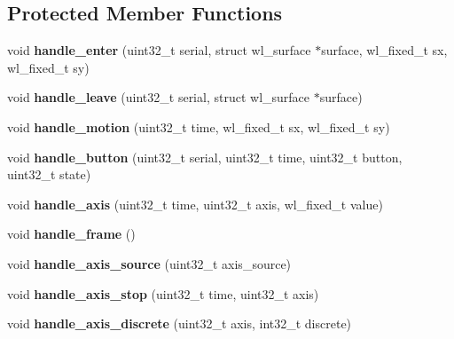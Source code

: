 \subsection*{Protected Member Functions}
\begin{DoxyCompactItemize}
\item 
\mbox{\label{classwayland_1_1Pointer_a6ea610d1c0aa682a272f5fded028b1ac}} 
void {\bfseries handle\+\_\+enter} (uint32\+\_\+t serial, struct wl\+\_\+surface $\ast$surface, wl\+\_\+fixed\+\_\+t sx, wl\+\_\+fixed\+\_\+t sy)
\item 
\mbox{\label{classwayland_1_1Pointer_a3b568853223df41028eef7b0ad0955f5}} 
void {\bfseries handle\+\_\+leave} (uint32\+\_\+t serial, struct wl\+\_\+surface $\ast$surface)
\item 
\mbox{\label{classwayland_1_1Pointer_a875bf5c1e192abc192e1f0f4b1d65129}} 
void {\bfseries handle\+\_\+motion} (uint32\+\_\+t time, wl\+\_\+fixed\+\_\+t sx, wl\+\_\+fixed\+\_\+t sy)
\item 
\mbox{\label{classwayland_1_1Pointer_accafd788ae8ee8f978069f2efed1eb2f}} 
void {\bfseries handle\+\_\+button} (uint32\+\_\+t serial, uint32\+\_\+t time, uint32\+\_\+t button, uint32\+\_\+t state)
\item 
\mbox{\label{classwayland_1_1Pointer_a825d83940d0df32230a3e1f9d512a1e1}} 
void {\bfseries handle\+\_\+axis} (uint32\+\_\+t time, uint32\+\_\+t axis, wl\+\_\+fixed\+\_\+t value)
\item 
\mbox{\label{classwayland_1_1Pointer_aa5e2ac07a520438bfd005af9e94690e9}} 
void {\bfseries handle\+\_\+frame} ()
\item 
\mbox{\label{classwayland_1_1Pointer_aab9c170cbcba30023ba64e0af9cb41e1}} 
void {\bfseries handle\+\_\+axis\+\_\+source} (uint32\+\_\+t axis\+\_\+source)
\item 
\mbox{\label{classwayland_1_1Pointer_a5101cdbf6f09d8b99e0a25f0ad7dcc34}} 
void {\bfseries handle\+\_\+axis\+\_\+stop} (uint32\+\_\+t time, uint32\+\_\+t axis)
\item 
\mbox{\label{classwayland_1_1Pointer_a8019dd2e5cd545d0caa27b4e091ceae3}} 
void {\bfseries handle\+\_\+axis\+\_\+discrete} (uint32\+\_\+t axis, int32\+\_\+t discrete)
\end{DoxyCompactItemize}
